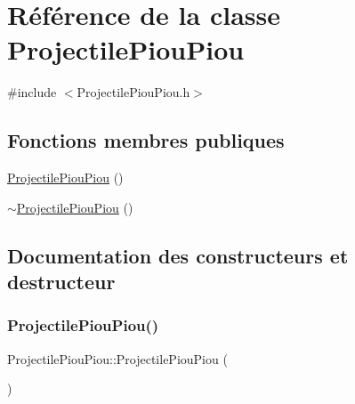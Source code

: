 \hypertarget{class_projectile_piou_piou}{}\section{Référence de la classe Projectile\+Piou\+Piou}
\label{class_projectile_piou_piou}


{\ttfamily \#include $<$Projectile\+Piou\+Piou.\+h$>$}

\subsection*{Fonctions membres publiques}
\begin{DoxyCompactItemize}
\item 
\hyperlink{class_projectile_piou_piou_add45028d2dc4b9f391ac5d723677e558}{Projectile\+Piou\+Piou} ()
\item 
\hyperlink{class_projectile_piou_piou_a5aa00e3bbcb78f98464b244c43bea880}{$\sim$\+Projectile\+Piou\+Piou} ()
\end{DoxyCompactItemize}


\subsection{Documentation des constructeurs et destructeur}
\mbox{\label{class_projectile_piou_piou_add45028d2dc4b9f391ac5d723677e558}} 
\subsubsection{\texorpdfstring{Projectile\+Piou\+Piou()}{ProjectilePiouPiou()}}
{\footnotesize\ttfamily Projectile\+Piou\+Piou\+::\+Projectile\+Piou\+Piou (\begin{DoxyParamCaption}{ }\end{DoxyParamCaption})}

\mbox{\label{class_projectile_piou_piou_a5aa00e3bbcb78f98464b244c43bea880}} 
